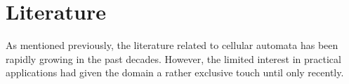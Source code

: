 \section{Literature}
\label{sec:lit}

As mentioned previously, the literature related to cellular automata has been rapidly growing in the past decades. However, the limited interest in practical applications had given the domain a rather exclusive touch until only recently. 
